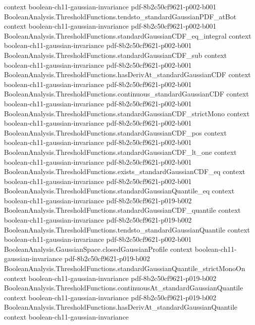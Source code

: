 \begin{theorem}
  {context}
  {boolean-ch11-gaussian-invariance}
  {pdf-8b2c50cf9621-p002-b001}
\proofstep
  {BooleanAnalysis.ThresholdFunctions.tendsto_standardGaussianPDF_atBot}
  {context}
  {boolean-ch11-gaussian-invariance}
  {pdf-8b2c50cf9621-p002-b001}
\proofstep
  {BooleanAnalysis.ThresholdFunctions.standardGaussianCDF_eq_integral}
  {context}
  {boolean-ch11-gaussian-invariance}
  {pdf-8b2c50cf9621-p002-b001}
\proofstep
  {BooleanAnalysis.ThresholdFunctions.standardGaussianCDF_sub}
  {context}
  {boolean-ch11-gaussian-invariance}
  {pdf-8b2c50cf9621-p002-b001}
\proofstep
  {BooleanAnalysis.ThresholdFunctions.hasDerivAt_standardGaussianCDF}
  {context}
  {boolean-ch11-gaussian-invariance}
  {pdf-8b2c50cf9621-p002-b001}
\proofstep
  {BooleanAnalysis.ThresholdFunctions.continuous_standardGaussianCDF}
  {context}
  {boolean-ch11-gaussian-invariance}
  {pdf-8b2c50cf9621-p002-b001}
\proofstep
  {BooleanAnalysis.ThresholdFunctions.standardGaussianCDF_strictMono}
  {context}
  {boolean-ch11-gaussian-invariance}
  {pdf-8b2c50cf9621-p002-b001}
\proofstep
  {BooleanAnalysis.ThresholdFunctions.standardGaussianCDF_pos}
  {context}
  {boolean-ch11-gaussian-invariance}
  {pdf-8b2c50cf9621-p002-b001}
\proofstep
  {BooleanAnalysis.ThresholdFunctions.standardGaussianCDF_lt_one}
  {context}
  {boolean-ch11-gaussian-invariance}
  {pdf-8b2c50cf9621-p002-b001}
\proofstep
  {BooleanAnalysis.ThresholdFunctions.exists_standardGaussianCDF_eq}
  {context}
  {boolean-ch11-gaussian-invariance}
  {pdf-8b2c50cf9621-p002-b001}
\proofstep
  {BooleanAnalysis.ThresholdFunctions.standardGaussianQuantile_eq}
  {context}
  {boolean-ch11-gaussian-invariance}
  {pdf-8b2c50cf9621-p019-b002}
\proofstep
  {BooleanAnalysis.ThresholdFunctions.standardGaussianCDF_quantile}
  {context}
  {boolean-ch11-gaussian-invariance}
  {pdf-8b2c50cf9621-p019-b002}
\proofstep
  {BooleanAnalysis.ThresholdFunctions.tendsto_standardGaussianQuantile}
  {context}
  {boolean-ch11-gaussian-invariance}
  {pdf-8b2c50cf9621-p002-b001}
\proofstep
  {BooleanAnalysis.GaussianSpace.closedGaussianProfile}
  {context}
  {boolean-ch11-gaussian-invariance}
  {pdf-8b2c50cf9621-p019-b002}
\proofstep
  {BooleanAnalysis.ThresholdFunctions.standardGaussianQuantile_strictMonoOn}
  {context}
  {boolean-ch11-gaussian-invariance}
  {pdf-8b2c50cf9621-p019-b002}
\proofstep
  {BooleanAnalysis.ThresholdFunctions.continuousAt_standardGaussianQuantile}
  {context}
  {boolean-ch11-gaussian-invariance}
  {pdf-8b2c50cf9621-p019-b002}
\proofstep
  {BooleanAnalysis.ThresholdFunctions.hasDerivAt_standardGaussianQuantile}
  {context}
  {boolean-ch11-gaussian-invariance}

\end{theorem}
